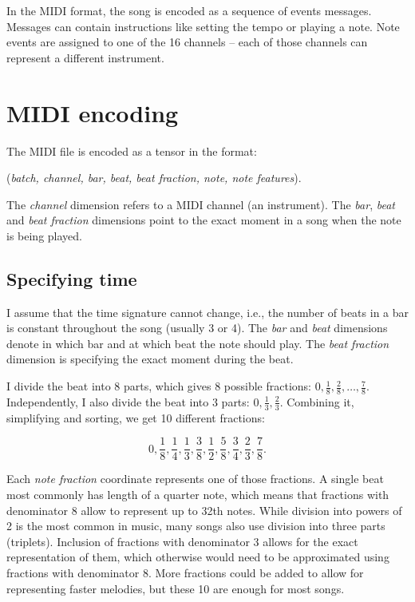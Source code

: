 \documentclass[en]{pracamgr}
\begin{document}
In the MIDI format, the song is encoded as a sequence of events messages.
Messages can contain instructions like setting the tempo or playing a note.
Note events are assigned to one of the 16 channels -- each of those channels can represent a different instrument.

\section{MIDI encoding}

The MIDI file is encoded as a tensor in the format:
\begin{center}
    (\emph{batch, channel, bar, beat, beat fraction, note, note features}).
\end{center}

The \emph{channel} dimension refers to a MIDI channel (an instrument).
The \emph{bar}, \emph{beat} and \emph{beat fraction} dimensions point to the exact moment in a song when the note is being played.

\subsection{Specifying time}

I assume that the time signature cannot change, i.e., the number of beats in a bar is constant throughout the song (usually 3 or 4).
The \emph{bar} and \emph{beat} dimensions denote in which bar and at which beat the note should play.
The \emph{beat fraction} dimension is specifying the exact moment during the beat.

I divide the beat into 8 parts, which gives 8 possible fractions: $0, \frac{1}{8}, \frac{2}{8}, \ldots, \frac{7}{8}$.
Independently, I also divide the beat into 3 parts: $0, \frac{1}{3}, \frac{2}{3}$.
Combining it, simplifying and sorting, we get 10 different fractions:

$$
0, \frac{1}{8}, \frac{1}{4}, \frac{1}{3}, \frac{3}{8}, \frac{1}{2}, \frac{5}{8}, \frac{3}{4}, \frac{2}{3}, \frac{7}{8}.
$$

Each \emph{note fraction} coordinate represents one of those fractions.
A single beat most commonly has length of a quarter note, which means that fractions with denominator 8 allow to represent up to 32th notes.
While division into powers of 2 is the most common in music, many songs also use division into three parts (triplets).
Inclusion of fractions with denominator 3 allows for the exact representation of them, which otherwise would need to be approximated using fractions with denominator 8.
More fractions could be added to allow for representing faster melodies, but these 10 are enough for most songs.
\end{document}
